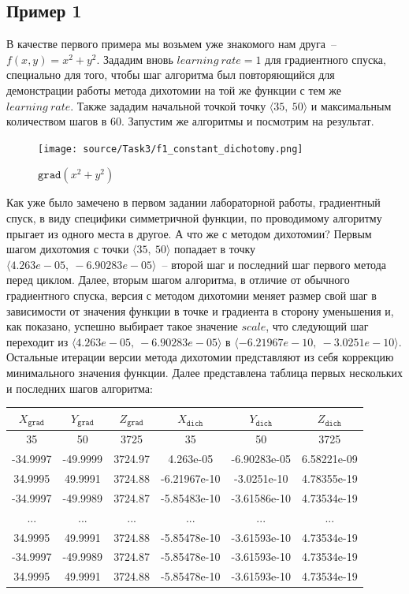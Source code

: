 \documentclass[12pt, a4paper, oneside, final]{article}
\begin{document}
	\subsection*{Пример 1}
	В качестве первого примера мы возьмем уже знакомого нам друга~-- $f(x, y) = x^{2} + y^{2}$. Зададим вновь $learning~rate = 1$ для градиентного спуска, специально для того, чтобы шаг алгоритма был повторяющийся для демонстрации работы метода дихотомии на той же функции с тем же $learning~rate$. Также зададим начальной точкой точку $\langle 35, ~ 50 \rangle$ и максимальным количеством шагов в $60$. Запустим же алгоритмы и посмотрим на результат.
	\begin{figure}[H]
		\centering
		\texttt{[image: source/Task3/f1\_constant\_dichotomy.png]}
		\caption{$\texttt{grad}(x^{2} + y^{2})$}
	\end{figure}
	Как уже было замечено в первом задании лабораторной работы, градиентный спуск, в виду специфики симметричной функции, по проводимому алгоритму прыгает из одного места в другое. А что же с методом дихотомии? Первым шагом дихотомия с точки $\langle 35, ~ 50\rangle$ попадает в точку $\langle 4.263e-05, ~  -6.90283e-05\rangle$~-- второй шаг и последний шаг первого метода перед циклом. Далее, вторым шагом алгоритма, в отличие от обычного градиентного спуска, версия с методом дихотомии меняет размер свой шаг в зависимости от значения функции в точке и градиента в сторону уменьшения и, как показано, успешно выбирает такое значение $scale$, что следующий шаг переходит из $\langle 4.263e-05, ~  -6.90283e-05\rangle$ в $\langle -6.21967e-10, ~ -3.0251e-10\rangle$. Остальные итерации версии метода дихотомии представляют из себя коррекцию минимального значения функции.
	Далее представлена таблица первых нескольких и последних шагов алгоритма:
	\begin{table}[H]
		\centering
		\begin{tabular}{|c|c|c|c|c|c|}
			$X_{\texttt{grad}}$ & $Y_{\texttt{grad}}$ & $Z_{\texttt{grad}}$ & $X_{\texttt{dich}}$ & $Y_{\texttt{dich}}$ & $Z_{\texttt{dich}}$ \\ \hline
			35&50&3725&35&50&3725 \\
			-34.9997&-49.9999&3724.97&4.263e-05&-6.90283e-05&6.58221e-09 \\
			34.9995&49.9991&3724.88&-6.21967e-10&-3.0251e-10&4.78355e-19 \\
			-34.9997&-49.9989&3724.87&-5.85483e-10&-3.61586e-10&4.73534e-19 \\
			...&...&...&...&...&... \\
			34.9995&49.9991&3724.88&-5.85478e-10&-3.61593e-10&4.73534e-19 \\
			-34.9997&-49.9989&3724.87&-5.85478e-10&-3.61593e-10&4.73534e-19 \\
			34.9995&49.9991&3724.88&-5.85478e-10&-3.61593e-10&4.73534e-19	
		\end{tabular}
	\end{table}
\end{document}
